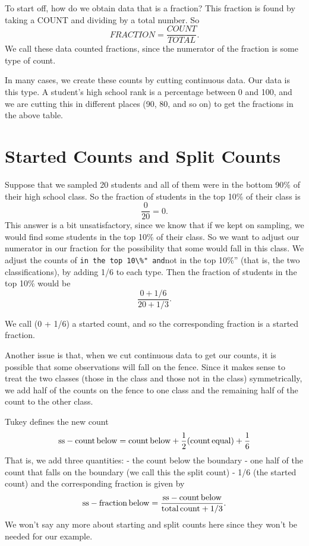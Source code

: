 \documentclass[
]{book}
\begin{document}
To start off, how do we obtain data that is a fraction? This fraction is found by taking a COUNT and dividing by a total number. So
\[
FRACTION = \frac{COUNT}{TOTAL}.
\]
We call these data counted fractions, since the numerator of the fraction is some type of count.

In many cases, we create these counts by cutting continuous data. Our data is this type. A student's high school rank is a percentage between 0 and 100, and we are cutting this in different places (90, 80, and so on) to get the fractions in the above table.

\hypertarget{started-counts-and-split-counts}{%
\section{Started Counts and Split Counts}\label{started-counts-and-split-counts}}

Suppose that we sampled 20 students and all of them were in the bottom 90\% of their high school class. So the fraction of students in the top 10\% of their class is
\[
\frac{0}{20} = 0.
\]
This answer is a bit unsatisfactory, since we know that if we kept on sampling, we would find some students in the top 10\% of their class. So we want to adjust our numerator in our fraction for the possibility that some would fall in this class. We adjust the counts of \texttt{in\ the\ top\ 10\textbackslash{}\%"\ and}not in the top 10\%'' (that is, the two classifications), by adding 1/6 to each type. Then the fraction of students in the top 10\% would be
\[
\frac{0 + 1/6}{20 + 1/3}.
\]

We call (0 + 1/6) a started count, and so the corresponding fraction is a started fraction.

Another issue is that, when we cut continuous data to get our counts, it is possible that some observations will fall on the fence. Since it makes sense to treat the two classes (those in the class and those not in the class) symmetrically, we add half of the counts on the fence to one class and the remaining half of the count to the other class.

Tukey defines the new count
\[
{\rm ss-count \, below} = {\rm count \, below} + \frac{1}{2} ({\rm count \, equal}) + \frac{1}{6}
\]
That is, we add three quantities:
- the count below the boundary
- one half of the count that falls on the boundary (we call this the split count)
- 1/6 (the started count)
and the corresponding fraction is given by
\[
{\rm ss-fraction \, below} = \frac{{\rm ss-count \,below}}
{{\rm total \, count} +1/3}.
\]
We won't say any more about starting and split counts here since they won't be needed for our example.
\end{document}

